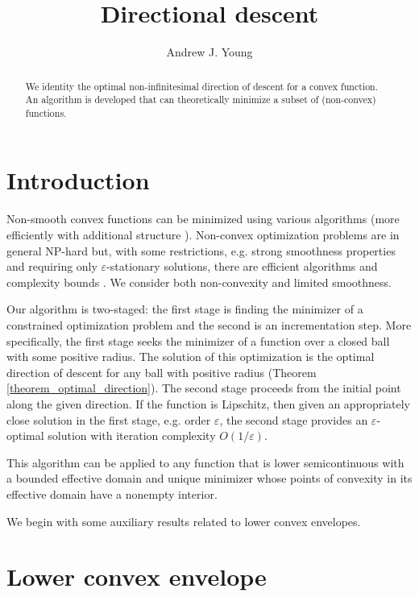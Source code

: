 \documentclass[12pt]{article}
\title{Directional descent}
\author{Andrew J. Young}
\date{}
\begin{document}
\maketitle

\begin{abstract}
We identity the optimal non-infinitesimal direction of descent for a convex function.
An algorithm is developed that can theoretically minimize a subset of (non-convex) functions.
\end{abstract}


\section{Introduction}

Non-smooth convex functions can be minimized using various algorithms \cite{Bertsekas2015} (more efficiently with additional structure \cite{Nesterov2005,Bertsekas2015}).
Non-convex optimization problems are in general NP-hard but, with some restrictions, e.g. strong smoothness properties and requiring only $\varepsilon$-stationary solutions, there are efficient algorithms \cite{Nesterov2006,Carmon2017,Clement2020} and complexity bounds \cite{Cartis2012,Carmon2020}.
We consider both non-convexity and limited smoothness.

Our algorithm is two-staged: the first stage is finding the minimizer of a constrained optimization problem and the second is an incrementation step.
More specifically, the first stage seeks the minimizer of a function over a closed ball with some positive radius.
The solution of this optimization is the optimal direction of descent for any ball with positive radius (Theorem \ref{theorem_optimal_direction}).
The second stage proceeds from the initial point along the given direction.
If the function is Lipschitz, then given an appropriately close solution in the first stage, e.g. order $\varepsilon$, the second stage provides an $\varepsilon$-optimal solution with iteration complexity $O(1/\varepsilon)$.

This algorithm can be applied to any function that is lower semicontinuous with a bounded effective domain and unique minimizer whose points of convexity in its effective domain have a nonempty interior.

We begin with some auxiliary results related to lower convex envelopes.


\section{Lower convex envelope}
\end{document}
